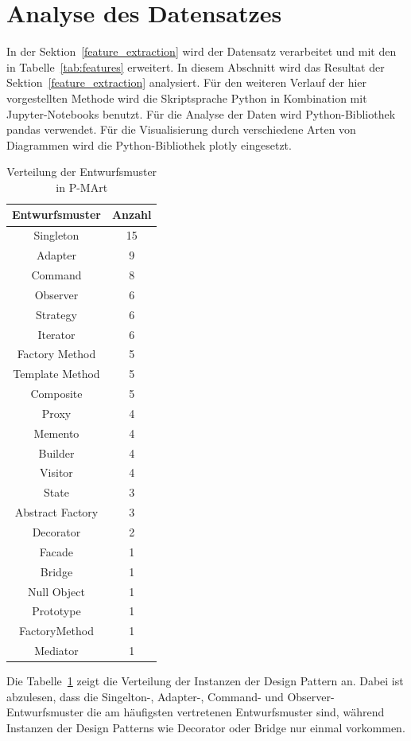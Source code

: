 \section{Analyse des Datensatzes}\label{dataset_analysis}

In der Sektion~\ref{feature_extraction} wird der Datensatz verarbeitet und mit den in Tabelle~\ref{tab:features} erweitert.
In diesem Abschnitt wird das Resultat der Sektion~\ref{feature_extraction} analysiert.
Für den weiteren Verlauf der hier vorgestellten Methode wird die Skriptsprache Python in Kombination mit Jupyter-Notebooks benutzt. Für die Analyse der Daten wird Python-Bibliothek pandas verwendet. Für die Visualisierung durch verschiedene Arten von Diagrammen wird die Python-Bibliothek plotly eingesetzt.


\begin{table}[h]
    \begin{tabular}{|c|c|}
        \hline
        Entwurfsmuster & Anzahl\\
        \hline
        Singleton&15\\Adapter&9\\Command&8\\Observer&6\\Strategy&6\\Iterator&6\\Factory Method&5\\Template Method&5\\Composite&5\\Proxy&4\\Memento&4\\Builder&4\\Visitor&4\\State&3\\Abstract Factory&3\\Decorator&2\\Facade&1\\Bridge&1\\Null Object&1\\Prototype&1\\FactoryMethod&1\\Mediator&1\\
        \hline
    \end{tabular}
    \caption{Verteilung der Entwurfsmuster in P-MArt}
    \label{tab:dp_dist}
\end{table}



Die Tabelle~\ref{tab:dp_dist} zeigt die Verteilung der Instanzen der Design Pattern an. 
Dabei ist abzulesen, dass die Singelton-, Adapter-, Command- und Observer-Entwurfsmuster die am häufigsten vertretenen Entwurfsmuster sind, während Instanzen der Design Patterns wie Decorator oder Bridge nur einmal vorkommen.

